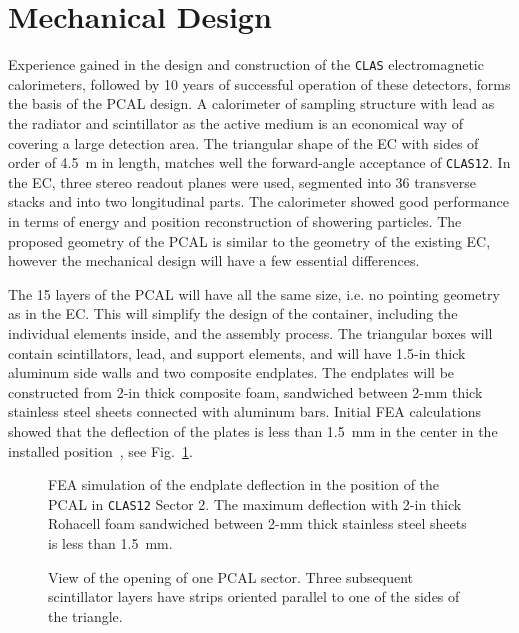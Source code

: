 \section{Mechanical Design}

Experience gained in the design and construction of the {\tt CLAS}
electromagnetic calorimeters, followed by 10 years of successful operation 
of these detectors, forms the basis of the PCAL design.  A calorimeter of 
sampling structure with lead as the radiator and scintillator as the active 
medium is an economical way of covering a large detection area.  The triangular
shape of the EC with sides of order of 4.5~m in length, matches well the 
forward-angle acceptance of {\tt CLAS12}.  In the EC, three stereo readout 
planes were used, segmented into 36 transverse stacks and into two 
longitudinal parts.  The calorimeter showed good performance in terms of 
energy and position reconstruction of showering particles.  The proposed 
geometry of the PCAL is similar to the geometry of the existing EC, however 
the mechanical design will have a few essential differences. 

The 15 layers of the PCAL will have all the same size, i.e. no pointing 
geometry as in the EC. This will simplify the design of the container, 
including the individual elements inside, and the assembly process.  The 
triangular boxes will contain scintillators, lead, and support elements, and
will have 1.5-in thick aluminum side walls and two composite endplates.  The 
endplates will be constructed from 2-in thick composite foam, sandwiched 
between 2-mm thick stainless steel sheets connected with aluminum bars. 
Initial FEA calculations showed that the deflection of the plates is less 
than 1.5~mm in the center in the installed position~\cite{philippe}, see 
Fig.~\ref{fig:plate}.  

\begin{figure}[ht]
\vspace{8.5cm}
\caption{\small{FEA simulation of the endplate deflection in the position of 
the PCAL in {\tt CLAS12} Sector 2.  The maximum deflection with 2-in thick
Rohacell foam sandwiched between 2-mm thick stainless steel sheets is
less than 1.5~mm.}}
\label{fig:plate} 
\end{figure}

\begin{figure}[ht]
\vspace{110mm}
\caption{\small{View of the opening of one PCAL sector. Three subsequent
scintillator layers have strips oriented parallel to one of the sides of
the triangle.}}
\label{fig:pcals} 
\end{figure}

